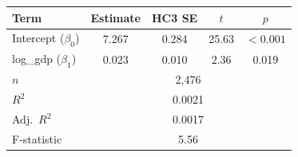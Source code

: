 \begin{tabular}{lcccc}
\toprule
Term & Estimate & HC3 SE & $t$ & $p$ \\
\midrule
Intercept ($\beta_0$) & 7.267 & 0.284 & 25.63 & $<0.001$ \\
log\_gdp ($\beta_1$) & 0.023 & 0.010 & 2.36 & 0.019 \\
\midrule
$n$ & \multicolumn{4}{c}{2{,}476} \\
$R^2$ & \multicolumn{4}{c}{0.0021} \\
Adj.\ $R^2$ & \multicolumn{4}{c}{0.0017} \\
F-statistic & \multicolumn{4}{c}{5.56} \\
\bottomrule
\end{tabular}